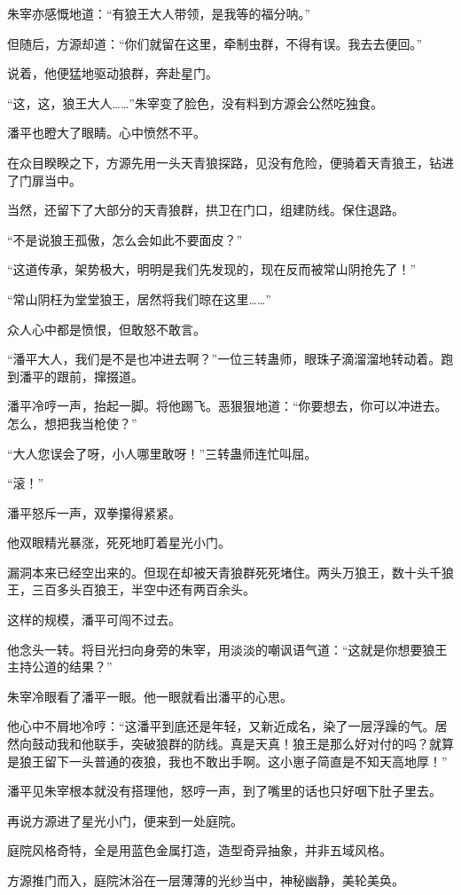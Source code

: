 \begin{this_body}
朱宰亦感慨地道：“有狼王大人带领，是我等的福分呐。”

但随后，方源却道：“你们就留在这里，牵制虫群，不得有误。我去去便回。”

说着，他便猛地驱动狼群，奔赴星门。

“这，这，狼王大人……”朱宰变了脸色，没有料到方源会公然吃独食。

潘平也瞪大了眼睛。心中愤然不平。

在众目睽睽之下，方源先用一头天青狼探路，见没有危险，便骑着天青狼王，钻进了门扉当中。

当然，还留下了大部分的天青狼群，拱卫在门口，组建防线。保住退路。

“不是说狼王孤傲，怎么会如此不要面皮？”

“这道传承，架势极大，明明是我们先发现的，现在反而被常山阴抢先了！”

“常山阴枉为堂堂狼王，居然将我们晾在这里……”

众人心中都是愤恨，但敢怒不敢言。

“潘平大人，我们是不是也冲进去啊？”一位三转蛊师，眼珠子滴溜溜地转动着。跑到潘平的跟前，撺掇道。

潘平冷哼一声，抬起一脚。将他踢飞。恶狠狠地道：“你要想去，你可以冲进去。怎么，想把我当枪使？”

“大人您误会了呀，小人哪里敢呀！”三转蛊师连忙叫屈。

“滚！”

潘平怒斥一声，双拳攥得紧紧。

他双眼精光暴涨，死死地盯着星光小门。

漏洞本来已经空出来的。但现在却被天青狼群死死堵住。两头万狼王，数十头千狼王，三百多头百狼王，半空中还有两百余头。

这样的规模，潘平可闯不过去。

他念头一转。将目光扫向身旁的朱宰，用淡淡的嘲讽语气道：“这就是你想要狼王主持公道的结果？”

朱宰冷眼看了潘平一眼。他一眼就看出潘平的心思。

他心中不屑地冷哼：“这潘平到底还是年轻，又新近成名，染了一层浮躁的气。居然向鼓动我和他联手，突破狼群的防线。真是天真！狼王是那么好对付的吗？就算是狼王留下一头普通的夜狼，我也不敢出手啊。这小崽子简直是不知天高地厚！”

潘平见朱宰根本就没有搭理他，怒哼一声，到了嘴里的话也只好咽下肚子里去。

再说方源进了星光小门，便来到一处庭院。

庭院风格奇特，全是用蓝色金属打造，造型奇异抽象，并非五域风格。

方源推门而入，庭院沐浴在一层薄薄的光纱当中，神秘幽静，美轮美奂。


\end{this_body}
